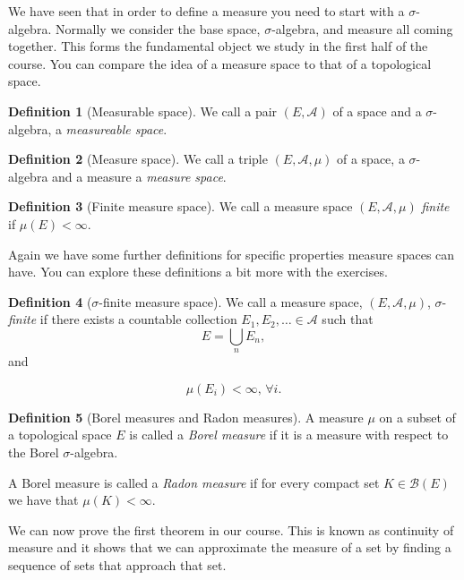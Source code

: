 \documentclass[
]{book}
\theoremstyle{definition}
\newtheorem{definition}{Definition}[chapter]
\theoremstyle{definition}
\theoremstyle{definition}
\theoremstyle{definition}
\theoremstyle{remark}
\begin{document}
We have seen that in order to define a measure you need to start with a \(\sigma\)-algebra. Normally we consider the base space, \(\sigma\)-algebra, and measure all coming together. This forms the fundamental object we study in the first half of the course. You can compare the idea of a measure space to that of a topological space.

\begin{definition}[Measurable space]
We call a pair \((E, \mathcal{A})\) of a space and a \(\sigma\)-algebra, a \emph{measureable space}.
\end{definition}

\begin{definition}[Measure space]
We call a triple \((E, \mathcal{A}, \mu)\) of a space, a \(\sigma\)-algebra and a measure a \emph{measure space}.
\end{definition}

\begin{definition}[Finite measure space]
We call a measure space \((E, \mathcal{A}, \mu)\) \emph{finite} if \(\mu(E) < \infty\).
\end{definition}

Again we have some further definitions for specific properties measure spaces can have. You can explore these definitions a bit more with the exercises.

\begin{definition}[$\sigma$-finite measure space]
We call a measure space, \((E, \mathcal{A}, \mu)\), \(\sigma\)-\emph{finite} if there exists a countable collection \(E_1, E_2, \dots \in \mathcal{A}\) such that
\[ E = \bigcup_n E_n, \]
and

\[ \mu(E_i) < \infty, \, \forall i. \]
\end{definition}

\begin{definition}[Borel measures and Radon measures]
A measure \(\mu\) on a subset of a topological space \(E\) is called a \emph{Borel measure} if it is a measure with respect to the Borel \(\sigma\)-algebra.

A Borel measure is called a \emph{Radon measure} if for every compact set \(K \in \mathcal{B}(E)\) we have that \(\mu(K) < \infty\).
\end{definition}

We can now prove the first theorem in our course. This is known as continuity of measure and it shows that we can approximate the measure of a set by finding a sequence of sets that approach that set.
\end{document}
